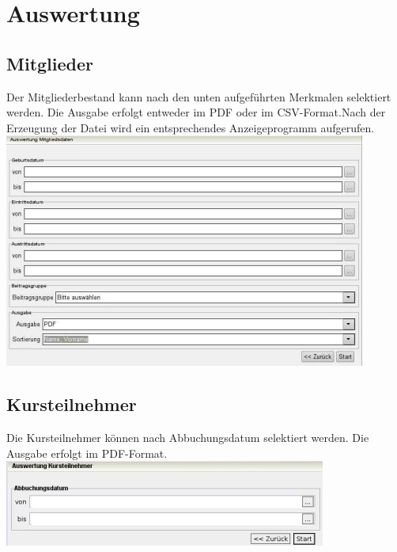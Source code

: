 \documentclass[a4paper,BCOR30mm,DIV14,pdftex,liststotoc,footsepline,openany]{scrbook}
\begin{document}
\chapter{Auswertung}

\section{Mitglieder}
Der Mitgliederbestand kann nach den unten aufgeführten Merkmalen selektiert werden. Die Ausgabe erfolgt entweder im PDF oder im CSV-Format.Nach der Erzeugung der Datei wird ein entsprechendes Anzeigeprogramm aufgerufen.\\
\includegraphics{./screenshots/mitgliedauswertung.jpg}\\

\section{Kursteilnehmer}
Die Kursteilnehmer können nach Abbuchungsdatum selektiert werden. Die Ausgabe erfolgt im PDF-Format.\\
\includegraphics{./screenshots/kursteilnehmerauswertung.jpg}\\
\end{document}
